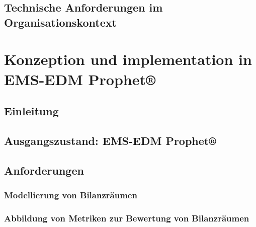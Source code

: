 \documentclass[a4paper,10pt,twoside]{report}
\begin{document}


\section{Technische Anforderungen im Organisationskontext}











\chapter{Konzeption und implementation in EMS-EDM Prophet®}
\section{Einleitung}

\section{Ausgangszustand: EMS-EDM Prophet®}

\section{Anforderungen}
\subsection{Modellierung von Bilanzräumen}

\subsection{Abbildung von Metriken zur Bewertung von Bilanzräumen}
\end{document}
